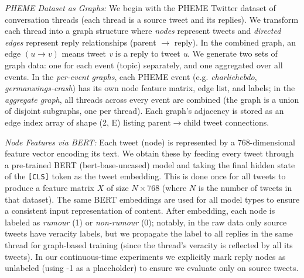 \documentclass{cshonours}
\begin{document}
\emph{PHEME Dataset as Graphs:} We begin with the PHEME Twitter dataset of conversation threads (each thread is a source tweet and its replies). We transform each thread into a graph structure where \emph{nodes} represent tweets and \emph{directed edges} represent reply relationships (parent $\rightarrow$ reply). In the combined graph, an edge $(u \to v)$ means tweet \emph{v} is a reply to tweet \emph{u}. We generate two sets of graph data: one for each event (topic) separately, and one aggregated over all events. In the \emph{per-event graphs}, each PHEME event (e.g. \emph{charliehebdo}, \emph{germanwings-crash}) has its own node feature matrix, edge list, and labels; in the \emph{aggregate graph}, all threads across every event are combined (the graph is a union of disjoint subgraphs, one per thread). Each graph's adjacency is stored as an edge index array of shape (2, E) listing parent$\rightarrow$child tweet connections.

\emph{Node Features via BERT:} Each tweet (node) is represented by a 768-dimensional feature vector encoding its text. We obtain these by feeding every tweet through a pre-trained BERT (bert-base-uncased) model and taking the final hidden state of the \texttt{[CLS]} token as the tweet embedding. This is done once for all tweets to produce a feature matrix $X$ of size $N \times 768$ (where $N$ is the number of tweets in that dataset). The same BERT embeddings are used for all model types to ensure a consistent input representation of content. After embedding, each node is labeled as \emph{rumour} (1) or \emph{non-rumour} (0); notably, in the raw data only source tweets have veracity labels, but we propagate the label to all replies in the same thread for graph-based training (since the thread's veracity is reflected by all its tweets). In our continuous-time experiments we explicitly mark reply nodes as unlabeled (using -1 as a placeholder) to ensure we evaluate only on source tweets.
\end{document}
